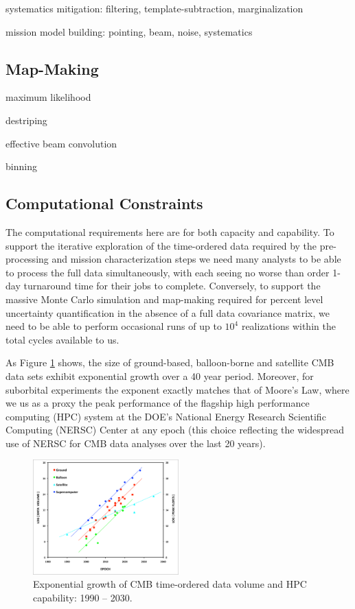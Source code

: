 systematics mitigation: filtering, template-subtraction, marginalization

mission model building: pointing, beam, noise, systematics

\subsection{Map-Making}

maximum likelihood

destriping

effective beam convolution

binning

\subsection{Computational Constraints}



The computational requirements here are for both capacity and capability. To support the iterative exploration of the time-ordered data required by the pre-processing and mission characterization steps we need many analysts to be able to process the full data simultaneously, with each seeing no worse than order 1-day turnaround time for their jobs to complete. Conversely, to support the massive Monte Carlo simulation and map-making required for percent level uncertainty quantification in the absence of a full data covariance matrix, we need to be able to perform occasional runs of up to $10^4$ realizations within the total cycles available to us.


As Figure \ref{fig_cmb_hpc_scaling} shows, the size of ground-based, balloon-borne and satellite CMB data sets exhibit exponential growth over a 40 year period. Moreover, for suborbital experiments the exponent exactly matches that of Moore's Law, where we us as a proxy the peak performance of the flagship high performance computing (HPC) system at the DOE's National Energy Research Scientific Computing (NERSC) Center at any epoch (this choice reflecting the widespread use of NERSC for CMB data analyses over the last 20 years). 



\begin{figure}[htbp]
\centering
\includegraphics[width=0.5\textwidth]{Analysis/cmb_hpc_scaling}
\caption{Exponential growth of CMB time-ordered data volume and HPC capability: 1990 -- 2030.}
\label{fig_cmb_hpc_scaling}
\end{figure}


